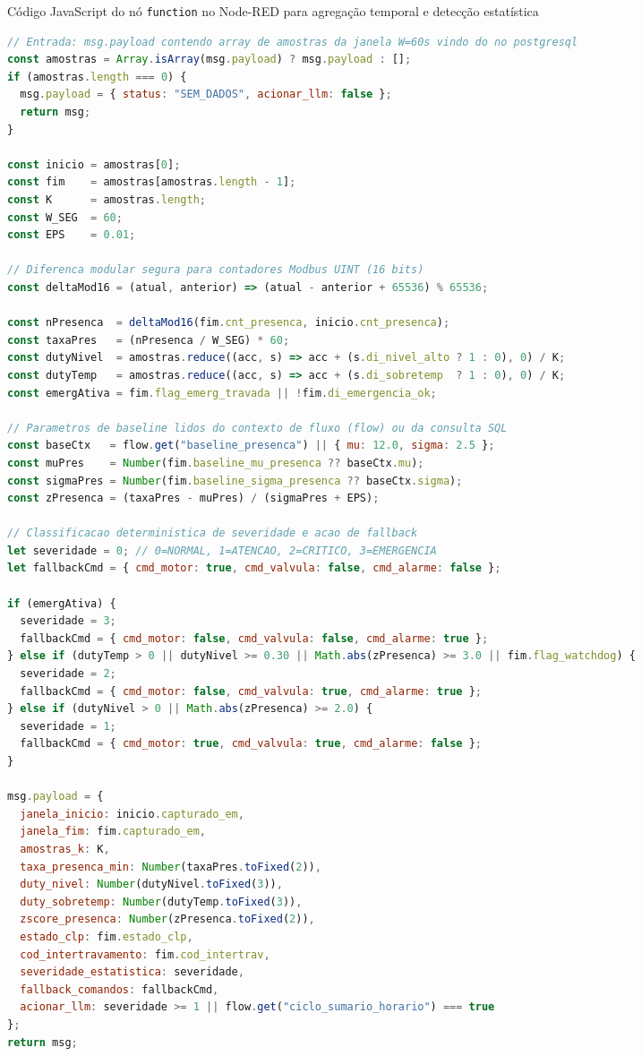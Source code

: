 \begin{quadro}[htb]
  \centering
  \SingleSpacing
  \caption{Código JavaScript do nó \texttt{function} no Node-RED para agregação temporal e detecção estatística}
  \label{quadro:codigo_js}
  \begin{lstlisting}[language=JavaScript]
// Entrada: msg.payload contendo array de amostras da janela W=60s vindo do no postgresql
const amostras = Array.isArray(msg.payload) ? msg.payload : [];
if (amostras.length === 0) {
  msg.payload = { status: "SEM_DADOS", acionar_llm: false };
  return msg;
}

const inicio = amostras[0];
const fim    = amostras[amostras.length - 1];
const K      = amostras.length;
const W_SEG  = 60;
const EPS    = 0.01;

// Diferenca modular segura para contadores Modbus UINT (16 bits)
const deltaMod16 = (atual, anterior) => (atual - anterior + 65536) % 65536;

const nPresenca  = deltaMod16(fim.cnt_presenca, inicio.cnt_presenca);
const taxaPres   = (nPresenca / W_SEG) * 60;
const dutyNivel  = amostras.reduce((acc, s) => acc + (s.di_nivel_alto ? 1 : 0), 0) / K;
const dutyTemp   = amostras.reduce((acc, s) => acc + (s.di_sobretemp  ? 1 : 0), 0) / K;
const emergAtiva = fim.flag_emerg_travada || !fim.di_emergencia_ok;

// Parametros de baseline lidos do contexto de fluxo (flow) ou da consulta SQL
const baseCtx   = flow.get("baseline_presenca") || { mu: 12.0, sigma: 2.5 };
const muPres    = Number(fim.baseline_mu_presenca ?? baseCtx.mu);
const sigmaPres = Number(fim.baseline_sigma_presenca ?? baseCtx.sigma);
const zPresenca = (taxaPres - muPres) / (sigmaPres + EPS);

// Classificacao deterministica de severidade e acao de fallback
let severidade = 0; // 0=NORMAL, 1=ATENCAO, 2=CRITICO, 3=EMERGENCIA
let fallbackCmd = { cmd_motor: true, cmd_valvula: false, cmd_alarme: false };

if (emergAtiva) {
  severidade = 3;
  fallbackCmd = { cmd_motor: false, cmd_valvula: false, cmd_alarme: true };
} else if (dutyTemp > 0 || dutyNivel >= 0.30 || Math.abs(zPresenca) >= 3.0 || fim.flag_watchdog) {
  severidade = 2;
  fallbackCmd = { cmd_motor: false, cmd_valvula: true, cmd_alarme: true };
} else if (dutyNivel > 0 || Math.abs(zPresenca) >= 2.0) {
  severidade = 1;
  fallbackCmd = { cmd_motor: true, cmd_valvula: true, cmd_alarme: false };
}

msg.payload = {
  janela_inicio: inicio.capturado_em,
  janela_fim: fim.capturado_em,
  amostras_k: K,
  taxa_presenca_min: Number(taxaPres.toFixed(2)),
  duty_nivel: Number(dutyNivel.toFixed(3)),
  duty_sobretemp: Number(dutyTemp.toFixed(3)),
  zscore_presenca: Number(zPresenca.toFixed(2)),
  estado_clp: fim.estado_clp,
  cod_intertravamento: fim.cod_intertrav,
  severidade_estatistica: severidade,
  fallback_comandos: fallbackCmd,
  acionar_llm: severidade >= 1 || flow.get("ciclo_sumario_horario") === true
};
return msg;
  \end{lstlisting}
\end{quadro}

